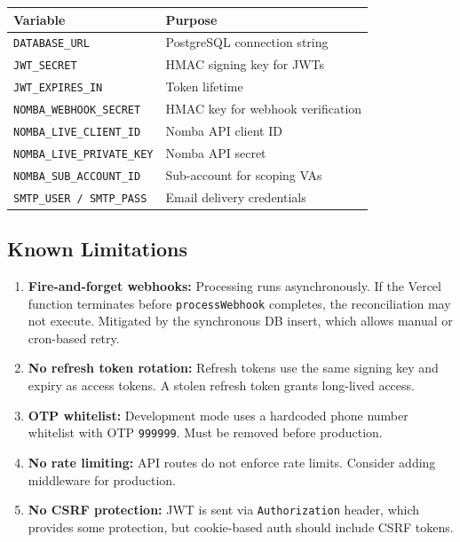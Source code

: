 \documentclass[11pt,a4paper]{article}
\begin{document}
\begin{table}[h]
  \centering
  \small
  \begin{tabular}{ll}
    \toprule
    Variable & Purpose \\
    \midrule
    \texttt{DATABASE\_URL}            & PostgreSQL connection string \\
    \texttt{JWT\_SECRET}              & HMAC signing key for JWTs \\
    \texttt{JWT\_EXPIRES\_IN}         & Token lifetime \\
    \texttt{NOMBA\_WEBHOOK\_SECRET}   & HMAC key for webhook verification \\
    \texttt{NOMBA\_LIVE\_CLIENT\_ID}  & Nomba API client ID \\
    \texttt{NOMBA\_LIVE\_PRIVATE\_KEY} & Nomba API secret \\
    \texttt{NOMBA\_SUB\_ACCOUNT\_ID}  & Sub-account for scoping VAs \\
    \texttt{SMTP\_USER / SMTP\_PASS}  & Email delivery credentials \\
    \bottomrule
  \end{tabular}
\end{table}

\subsection{Known Limitations}

\begin{enumerate}[nosep]
  \item \textbf{Fire-and-forget webhooks:} Processing runs asynchronously.
        If the Vercel function terminates before \texttt{processWebhook}
        completes, the reconciliation may not execute. Mitigated by the
        synchronous DB insert, which allows manual or cron-based retry.
  \item \textbf{No refresh token rotation:} Refresh tokens use the same
        signing key and expiry as access tokens. A stolen refresh token
        grants long-lived access.
  \item \textbf{OTP whitelist:} Development mode uses a hardcoded phone
        number whitelist with OTP \texttt{999999}. Must be removed before
        production.
  \item \textbf{No rate limiting:} API routes do not enforce rate limits.
        Consider adding middleware for production.
  \item \textbf{No CSRF protection:} JWT is sent via \texttt{Authorization}
        header, which provides some protection, but cookie-based auth
        should include CSRF tokens.
\end{enumerate}
\end{document}
